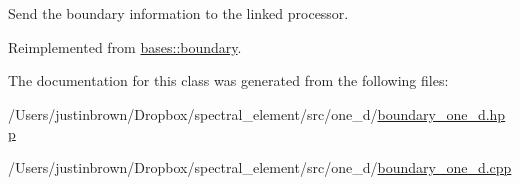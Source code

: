 Send the boundary information to the linked processor. 



 

 

Reimplemented from \hyperlink{classbases_1_1boundary_a84c47f979eac14d45c8ff9c09cc170a8}{bases\-::boundary}.



The documentation for this class was generated from the following files\-:\begin{DoxyCompactItemize}
\item 
/\-Users/justinbrown/\-Dropbox/spectral\-\_\-element/src/one\-\_\-d/\hyperlink{boundary__one__d_8hpp}{boundary\-\_\-one\-\_\-d.\-hpp}\item 
/\-Users/justinbrown/\-Dropbox/spectral\-\_\-element/src/one\-\_\-d/\hyperlink{boundary__one__d_8cpp}{boundary\-\_\-one\-\_\-d.\-cpp}\end{DoxyCompactItemize}
